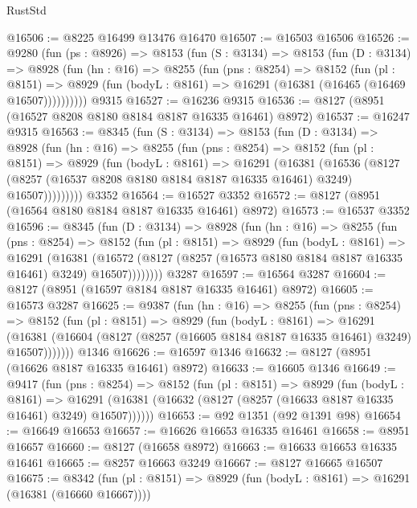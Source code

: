 \begin{lexlean}{RustStd}
\begin{coremodule}
@16506 := @8225 @16499 @13476 @16470
@16507 := @16503 @16506
@16526 := @9280
    (fun (ps : @8926) =>
    @8153
      (fun (S : @3134) =>
      @8153
        (fun (D : @3134) =>
        @8928
          (fun (hn : @16) =>
          @8255
            (fun (pns : @8254) =>
            @8152
              (fun (pl : @8151) =>
              @8929 (fun (bodyL : @8161) => @16291 (@16381 (@16465 (@16469 @16507))))))))))
    @9315
@16527 := @16236 @9315
@16536 := @8127 (@8951 (@16527 @8208 @8180 @8184 @8187 @16335 @16461) @8972)
@16537 := @16247 @9315
@16563 := @8345
    (fun (S : @3134) =>
    @8153
      (fun (D : @3134) =>
      @8928
        (fun (hn : @16) =>
        @8255
          (fun (pns : @8254) =>
          @8152
            (fun (pl : @8151) =>
            @8929
              (fun (bodyL : @8161) =>
              @16291
                (@16381
                  (@16536
                    (@8127
                      (@8257 (@16537 @8208 @8180 @8184 @8187 @16335 @16461) @3249)
                      @16507)))))))))
    @3352
@16564 := @16527 @3352
@16572 := @8127 (@8951 (@16564 @8180 @8184 @8187 @16335 @16461) @8972)
@16573 := @16537 @3352
@16596 := @8345
    (fun (D : @3134) =>
    @8928
      (fun (hn : @16) =>
      @8255
        (fun (pns : @8254) =>
        @8152
          (fun (pl : @8151) =>
          @8929
            (fun (bodyL : @8161) =>
            @16291
              (@16381
                (@16572 (@8127 (@8257 (@16573 @8180 @8184 @8187 @16335 @16461) @3249) @16507))))))))
    @3287
@16597 := @16564 @3287
@16604 := @8127 (@8951 (@16597 @8184 @8187 @16335 @16461) @8972)
@16605 := @16573 @3287
@16625 := @9387
    (fun (hn : @16) =>
    @8255
      (fun (pns : @8254) =>
      @8152
        (fun (pl : @8151) =>
        @8929
          (fun (bodyL : @8161) =>
          @16291
            (@16381 (@16604 (@8127 (@8257 (@16605 @8184 @8187 @16335 @16461) @3249) @16507)))))))
    @1346
@16626 := @16597 @1346
@16632 := @8127 (@8951 (@16626 @8187 @16335 @16461) @8972)
@16633 := @16605 @1346
@16649 := @9417
    (fun (pns : @8254) =>
    @8152
      (fun (pl : @8151) =>
      @8929
        (fun (bodyL : @8161) =>
        @16291 (@16381 (@16632 (@8127 (@8257 (@16633 @8187 @16335 @16461) @3249) @16507))))))
@16653 := @92 @1351 (@92 @1391 @98)
@16654 := @16649 @16653
@16657 := @16626 @16653 @16335 @16461
@16658 := @8951 @16657
@16660 := @8127 (@16658 @8972)
@16663 := @16633 @16653 @16335 @16461
@16665 := @8257 @16663 @3249
@16667 := @8127 @16665 @16507
@16675 := @8342
    (fun (pl : @8151) => @8929 (fun (bodyL : @8161) => @16291 (@16381 (@16660 @16667))))

\end{coremodule}
\end{lexlean}
